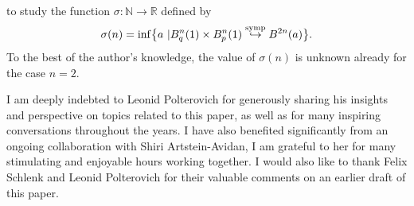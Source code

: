 \documentclass{icmart}
\newtheorem{question}[theorem]{Question}
\theoremstyle{definition}
\begin{document}
to study the  function $\sigma: {\mathbb N} \rightarrow {\mathbb R}$ defined by 
$$ \sigma(n) = \inf  \bigl \{a \ |  B^n_q(1)  \times B^n_p(1)  \stackrel{\rm symp} \hookrightarrow B^{2n}(a)  \bigr \}.$$
To the best of the author's knowledge, the value of $\sigma(n)$ is unknown already for the case  $n=2$. 


\bigskip



 I am  deeply indebted to Leonid Polterovich for generously sharing his insights and perspective on topics related to this paper, as well as for many inspiring conversations throughout the years. I have also benefited significantly from an ongoing collaboration with Shiri Artstein-Avidan, I am grateful to her for many stimulating and enjoyable hours working together. I would also like to thank Felix Schlenk and Leonid Polterovich for their valuable comments on an earlier draft of this paper.
%
%
\end{document}
